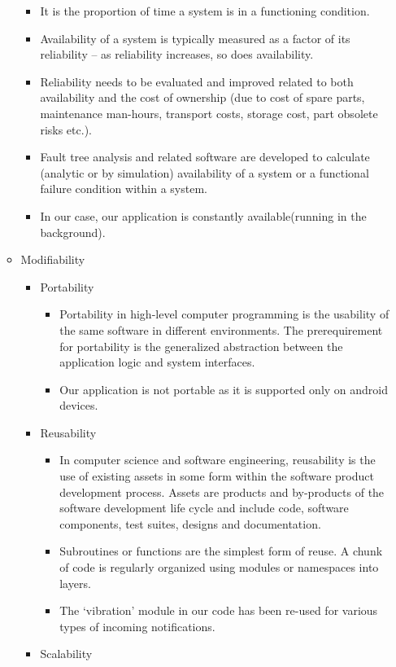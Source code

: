 \documentclass[12pt,a4paper]{report}
\begin{document}
\begin{itemize}
\begin{itemize}
		\begin{itemize}
			\item It is the proportion of time a system is in a functioning condition.
			\item Availability of a system is typically measured as a factor of its reliability – as reliability increases, so does availability.
			\item Reliability needs to be evaluated and improved related to both availability and the cost of ownership (due to cost of spare parts, maintenance man-hours, transport costs, storage cost, part obsolete risks etc.).
			\item Fault tree analysis and related software are developed to calculate (analytic or by simulation) availability of a system or a functional failure condition within a system.
			\item In our case, our application is constantly available(running in the background).
		\end{itemize}
		\item Modifiability
		
		\begin{itemize}
			\item Portability
			
			\begin{itemize}
				\item Portability in high-level computer programming is the usability of the same software in different environments. The prerequirement for portability is the generalized abstraction between the application logic and system interfaces.
				\item Our application is not portable as it is supported only on android devices.
			\end{itemize}
			\item Reusability
			
			\begin{itemize}
				\item In computer science and software engineering, reusability is the use of existing assets in some form within the software product development process. Assets are products and by-products of the software development life cycle and include code, software components, test suites, designs and documentation.
				\item Subroutines or functions are the simplest form of reuse. A chunk of code is regularly organized using modules or namespaces into layers.
				\item The ‘vibration’ module in our code has been re-used for various types of incoming notifications.
			\end{itemize}
			\item Scalability
			

\end{itemize}
\end{itemize}
\end{itemize}
\end{document}
